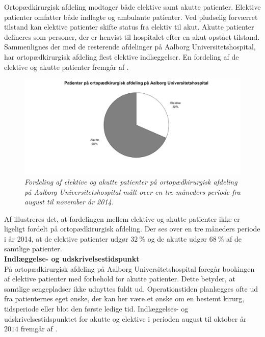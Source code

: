 Ortopædkirurgisk afdeling modtager både elektive samt akutte patienter. Elektive patienter omfatter både indlagte og ambulante patienter. Ved pludselig forværret tilstand kan elektive patienter skifte status fra elektiv til akut. Akutte patienter defineres som personer, der er henvist til hospitalet efter en akut opstået tilstand. Sammenlignes der med de resterende afdelinger på Aalborg Universitetshospital, har ortopædkirurgisk afdeling flest elektive indlæggelser.\cite{RegionNord2016} En fordeling af de elektive og akutte patienter fremgår af .

\begin{figure}[H]
	\flushleft 
	\centering
	\includegraphics[scale=0.55]{figures/elektivvsakut.png}
	\flushleft
	\caption{\textit{Fordeling af elektive og akutte patienter på ortopædkirurgisk afdeling på Aalborg Universitetshospital målt over en tre måneders periode fra august til november år 2014.}}
	\label{elektivvsakut}
	\end{figure}

\noindent
Af  illustreres det, at fordelingen mellem elektive og akutte patienter ikke er ligeligt fordelt på ortopædkirurgisk afdeling. Der ses over en tre måneders periode i år 2014, at de elektive patienter udgør $32~\%$ og de akutte udgør $68~\%$ af de samtlige patienter. \\

\noindent
\textbf{Indlæggelse- og udskrivelsestidspunkt} \\
På ortopædkirurgisk afdeling på Aalborg Universitetshospital foregår bookingen af elektive patienter med forbehold for akutte patienter. Dette betyder, at samtlige sengepladser ikke udnyttes fuldt ud. Operationstiden planlægges ofte ud fra patienternes eget ønske, der kan her være et ønske om en bestemt kirurg, tidsperiode eller blot den første ledige tid. Indlæggelses- og udskrivelsestidspunktet for akutte og elektive i perioden august til oktober år $2014$ fremgår af . 


